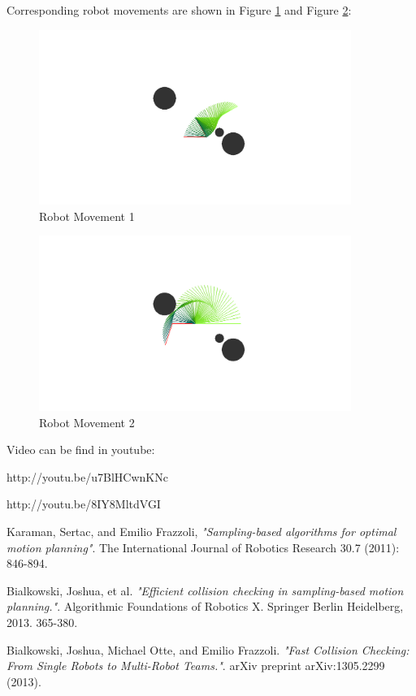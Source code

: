 \documentclass{article}
\begin{document}
    Corresponding robot movements are shown in Figure \ref{fig:move1} and Figure \ref{fig:move2}:

    \begin{figure}
      \centering
      \includegraphics[width=4in]{Movement1.PNG}
      \caption{Robot Movement 1}
      \label{fig:move1}
    \end{figure}

    \begin{figure}
      \centering
      \includegraphics[width=4in]{Movement2.PNG}
      \caption{Robot Movement 2}
      \label{fig:move2}
    \end{figure}

    Video can be find in youtube: 
    
    http://youtu.be/u7BlHCwnKNc

    http://youtu.be/8IY8MltdVGI

\begin{thebibliography}{9}

  Karaman, Sertac, and Emilio Frazzoli,
  \emph{"Sampling-based algorithms for optimal motion planning"}.
  The International Journal of Robotics Research 30.7 (2011): 846-894.

  Bialkowski, Joshua, et al.
  \emph{"Efficient collision checking in sampling-based motion planning."}. Algorithmic Foundations of Robotics X. Springer Berlin Heidelberg, 2013. 365-380.

  Bialkowski, Joshua, Michael Otte, and Emilio Frazzoli. 
  \emph{"Fast Collision Checking: From Single Robots to Multi-Robot Teams."}. 
  arXiv preprint arXiv:1305.2299 (2013).

\end{thebibliography}
\end{document}

